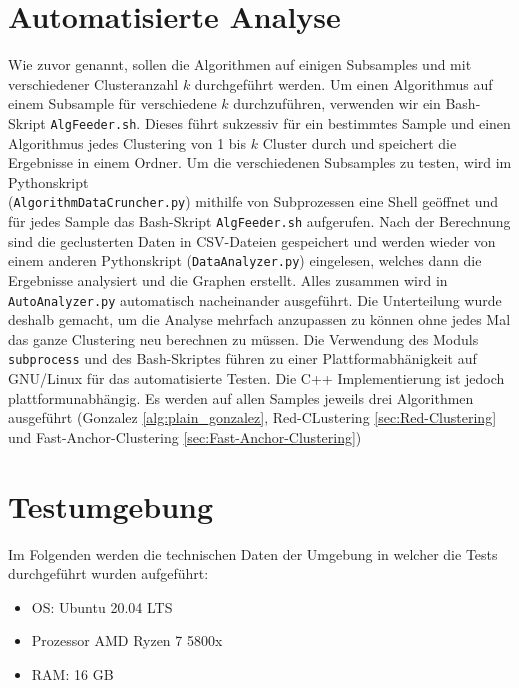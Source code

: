 \section{Automatisierte Analyse}
    Wie zuvor genannt, sollen die Algorithmen auf einigen Subsamples und mit verschiedener Clusteranzahl $k$ durchgeführt werden. Um einen Algorithmus auf einem Subsample für verschiedene $k$ durchzuführen, verwenden wir ein Bash-Skript \verb+AlgFeeder.sh+. Dieses führt sukzessiv für ein bestimmtes Sample und einen Algorithmus jedes Clustering von 1 bis $k$ Cluster durch und speichert die Ergebnisse in einem Ordner. \newline
    Um die verschiedenen Subsamples zu testen, wird im Pythonskript \\ (\verb+AlgorithmDataCruncher.py+) mithilfe von Subprozessen eine Shell geöffnet und für jedes Sample das Bash-Skript \verb+AlgFeeder.sh+ aufgerufen. Nach der Berechnung sind die geclusterten Daten in CSV-Dateien gespeichert und werden wieder von einem anderen Pythonskript (\verb+DataAnalyzer.py+) eingelesen, welches dann die Ergebnisse analysiert und die Graphen erstellt. Alles zusammen wird in \verb+AutoAnalyzer.py+ automatisch nacheinander ausgeführt. Die Unterteilung wurde deshalb gemacht, um die Analyse mehrfach anzupassen zu können ohne jedes Mal das ganze Clustering neu berechnen zu müssen.\newline
    Die Verwendung des Moduls \verb+subprocess+ und des Bash-Skriptes führen zu einer Plattformabhänigkeit auf GNU/Linux für das automatisierte Testen. Die C++ Implementierung ist jedoch plattformunabhängig. \newline
    Es werden auf allen Samples jeweils drei Algorithmen ausgeführt (Gonzalez \ref{alg:plain_gonzalez}, Red-CLustering \ref{sec:Red-Clustering} und Fast-Anchor-Clustering \ref{sec:Fast-Anchor-Clustering})
    

\section{Testumgebung}
    Im Folgenden werden die technischen Daten der Umgebung in welcher die Tests durchgeführt wurden aufgeführt:
    \begin{itemize}
        \item OS: Ubuntu 20.04 LTS
        \item Prozessor AMD Ryzen 7 5800x
        \item RAM: 16 GB
    \end{itemize}

